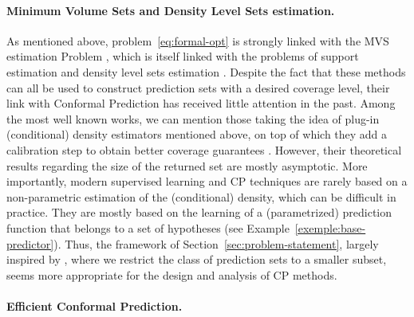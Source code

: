 \paragraph{Minimum Volume Sets and Density Level Sets estimation.} As mentioned above, problem~\eqref{eq:formal-opt} is strongly linked with the MVS estimation Problem \citep{NIPS2005_d3d80b65}, which is itself linked with the problems of support estimation \citep{scholkopf2001estimating,munoz2006estimation} and density level sets estimation \citep{polonik2000conditional}. Despite the fact that these methods can all be used to construct prediction sets with a desired coverage level, their link with Conformal Prediction has received little attention in the past. Among the most well known works, we can mention those taking the idea of plug-in (conditional) density estimators mentioned above, on top of which they add a calibration step to obtain better coverage guarantees \citep{lei2013distribution,lei2014distribution,izbicki2022cd,chernozhukov2021distributional}. However, their theoretical results regarding the size of the returned set are mostly asymptotic. More importantly, modern supervised learning and CP techniques are rarely based on a non-parametric estimation of the (conditional) density, which can be difficult in practice. They are mostly based on the learning of a (parametrized) prediction function that belongs to a set of hypotheses (see Example~\ref{exemple:base-predictor}). Thus, the framework of Section~\ref{sec:problem-statement}, largely inspired by \citet{NIPS2005_d3d80b65}, where we restrict the class of prediction sets to a smaller subset, seems more appropriate for the design and analysis of CP methods.


\paragraph{Efficient Conformal Prediction.} 


